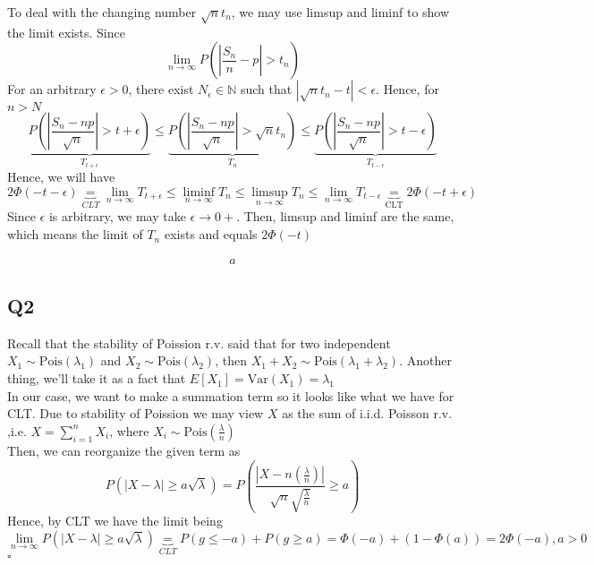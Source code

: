 \documentclass[12pt]{article}
\begin{document}
To deal with the changing number \(\sqrt{n} t_{n} \), we may use limsup and liminf to show the limit exists. 
Since  
\[
    \lim\limits_{n \to \infty} P(\left\vert \frac{S_{n}}{n} -p \right\vert > t_{n}) 
\]
For an arbitrary \(\epsilon >0\), there exist \(N_{\epsilon }\in \mathbb{N}\) such that \(\left\vert \sqrt{n} t_{n} -t \right\vert < \epsilon \). Hence, for \(n > N\)  
\[
 \underbrace{P(\left\vert \frac{S_{n} - np}{\sqrt{n} } \right\vert > t + \epsilon )}_{T_{t+\epsilon }} \leq \underbrace{ P(\left\vert \frac{S_{n} - np}{\sqrt{n} } \right\vert > \sqrt{n} t_{n}) }_{T_n} \leq \underbrace{P(\left\vert \frac{S_{n} - np}{\sqrt{n} } \right\vert > t-\epsilon )}_{T_{t-\epsilon }} 
\]
Hence, we will have  
\[
   2\Phi(-t -\epsilon )     \underbrace{=}_{CLT} \lim\limits_{n \to \infty} T_{t + \epsilon} \leq  \liminf\limits_{n\rightarrow \infty } T_{n}   \leq \limsup\limits_{n\rightarrow \infty } T_{n}  \leq \lim\limits_{n \to \infty} T_{t-\epsilon} \underbrace{=}_{\text{CLT}} 2\Phi(-t + \epsilon )  
\]
Since \(\epsilon\) is arbitrary, we may take \(\epsilon \to 0+\). 
Then, limsup and liminf are the same, which means the limit of \(T_n\) exists and equals \(2\Phi(-t)\) 

\begin{equation*}
    \begin{aligned}
        a
    \end{aligned}
\end{equation*} 
\subsection*{Q2}
Recall that the stability of Poission r.v. said that for two independent \(X_1 \sim \text{Pois} (\lambda_1)\) and \(X_2 \sim \text{Pois} (\lambda_2)\), then \(X_1 + X_2 \sim \text{Pois}(\lambda_1 + \lambda_2) \). 
Another thing, we'll take it as a fact that \(E[X_1] = \text{Var}(X_1) = \lambda_1  \) 
\\
In our case, we want to make a summation term so it looks like what we have for CLT. Due to stability of Poission we may view \(X\) as the sum of i.i.d. Poisson r.v. 
,i.e. \(X = \sum_{i=1}^{n} X_i\), where \(X_i \sim \text{Pois}(\frac{\lambda}{n}) \) 
\\Then, we can reorganize the given term as 
\[
    P(\left\vert X - \lambda  \right\vert \geq a \sqrt{\lambda }  ) = P(\frac{\left\vert X - n(\frac{\lambda}{n}) \right\vert}{\sqrt{n}\sqrt{\frac{\lambda}{n}}  }  \geq a)
\]
Hence, by CLT we have the limit being
\[
    \lim\limits_{n \to \infty}  P(\left\vert X - \lambda  \right\vert \geq a \sqrt{\lambda }  ) \underbrace{=}_{CLT} P(g \leq  -a) + P(g \geq a) = \Phi(-a) + (1-\Phi(a)) = 2\Phi(-a), a > 0 
\]
\hspace{\textwidth}\(\square\) 
\end{document}
